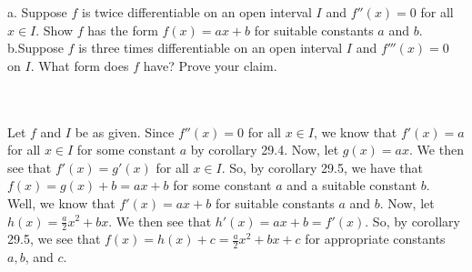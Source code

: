a. Suppose $f$ is twice differentiable on an open interval $I$ and $f''(x)=0$ for all $x\in I$. Show $f$
has the form $f(x)=ax+b$ for suitable constants $a$ and $b$.\\

b.Suppose $f$ is three times differentiable on an open interval $I$ and $f'''(x)=0$ on $I$. What form
does $f$ have? Prove your claim.\\\\

\begin{solution}\renewcommand{\qedsymbol}{}\ \\
    Let $f$ and $I$ be as given. Since $f''(x)=0$ for all $x\in I$, we know that $f'(x)=a$ for all
    $x\in I$ for some constant $a$ by corollary 29.4. Now, let $g(x)=ax$. We then see that $f'(x)=g'(x)$
    for all $x\in I$. So, by corollary 29.5, we have that $f(x)=g(x)+b=ax+b$ for some constant $a$ and a
    suitable constant $b$.\\

    Well, we know that $f'(x)=ax+b$ for suitable constants $a$ and $b$. Now, let
    $h(x)=\frac{a}{2}x^2+bx$. We then see that $h'(x)=ax+b=f'(x)$. So, by corollary 29.5, we see that
    $f(x)=h(x)+c=\frac{a}{2}x^2+bx+c$ for appropriate constants $a ,b$, and $c$.

\end{solution}